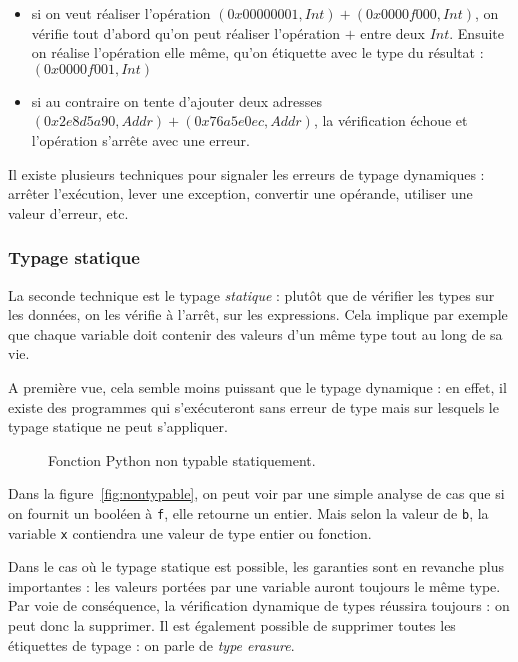 \begin{itemize}
\item
  si on veut réaliser l'opération
  $(0x00000001, Int) + (0x0000f000, Int)$, on vérifie tout d'abord qu'on
  peut réaliser l'opération $+$ entre deux $Int$. Ensuite on réalise
  l'opération elle même, qu'on étiquette avec le type du résultat :
  $(0x0000f001, Int)$
\item
  si au contraire on tente d'ajouter deux adresses
  $(0x2e8d5a90, Addr) + (0x76a5e0ec, Addr)$, la vérification échoue et
  l'opération s'arrête avec une erreur.
\end{itemize}

Il existe plusieurs techniques pour signaler les erreurs de typage dynamiques :
arrêter l'exécution, lever une exception, convertir une opérande, utiliser une
valeur d'erreur, etc.

\subsubsection{Typage statique}

La seconde technique est le typage \emph{statique} : plutôt que de vérifier les
types sur les données, on les vérifie à l'arrêt, sur les expressions. Cela
implique par exemple que chaque variable doit contenir des valeurs d'un même
type tout au long de sa vie.

A première vue, cela semble moins puissant que le typage dynamique : en effet,
il existe des programmes qui s'exécuteront sans erreur de type mais sur lesquels
le typage statique ne peut s'appliquer.

\begin{figure}
  \caption{Fonction Python non typable statiquement.}
  \label{fig:nontypage}
\end{figure}

Dans la figure~\ref{fig:nontypable}, on peut voir par une simple analyse de cas
que si on fournit un booléen à \texttt{f}, elle retourne un entier. Mais selon
la valeur de \texttt{b}, la variable \texttt{x} contiendra une valeur de type
entier ou fonction.

Dans le cas où le typage statique est possible, les garanties sont en revanche
plus importantes : les valeurs portées par une variable auront toujours le même
type. Par voie de conséquence, la vérification dynamique de types réussira
toujours : on peut donc la supprimer. Il est également possible de supprimer
toutes les étiquettes de typage : on parle de \emph{type erasure}.

